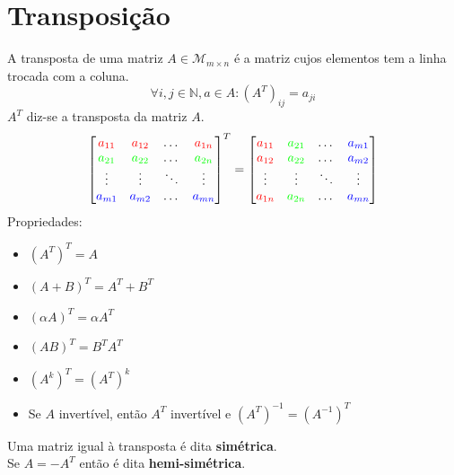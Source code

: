 \documentclass[]{report}
\begin{document}
\section{Transposição}
A transposta de uma matriz $A \in \mathcal{M}_{m \times n}$ é a matriz cujos elementos tem a linha trocada com a coluna. $$\forall i,j \in \mathbb{N}, a \in A: (A^T)_{ij} = a_{ji}$$
$A^T$ diz-se a transposta da matriz $A$.
$$
\begin{bmatrix}
\color{red}a_{11} & \color{red}a_{12} & \dots & \color{red}a_{1n}\\
\color{green}a_{21} & \color{green}a_{22} & \dots & \color{green}a_{2n}\\
\vdots & \vdots & \ddots & \vdots\\
\color{blue}a_{m1} & \color{blue}a_{m2} & \dots & \color{blue}a_{mn}
\end{bmatrix}^T
=
\begin{bmatrix}
\color{red}a_{11} & \color{green}a_{21} & \dots & \color{blue}a_{m1}\\
\color{red}a_{12} & \color{green}a_{22} & \dots & \color{blue}a_{m2}\\
\vdots & \vdots & \ddots & \vdots\\
\color{red}a_{1n} & \color{green}a_{2n} & \dots & \color{blue}a_{mn}
\end{bmatrix}
$$
Propriedades:
\begin{itemize}
\item $(A^T)^T = A$
\item $(A+B)^T = A^T + B^T$
\item $(\alpha A)^T = \alpha A^T$
\item $(AB)^T = B^T A^T$
\item $(A^k)^T = (A^T)^k$
\item Se $A$ invertível, então $A^T$ invertível e $(A^T)^{-1} = (A^{-1})^T$
\end{itemize}
Uma matriz igual à transposta é dita \textbf{simétrica}.\\
Se $A=-A^T$ então é dita \textbf{hemi-simétrica}.
\end{document}
